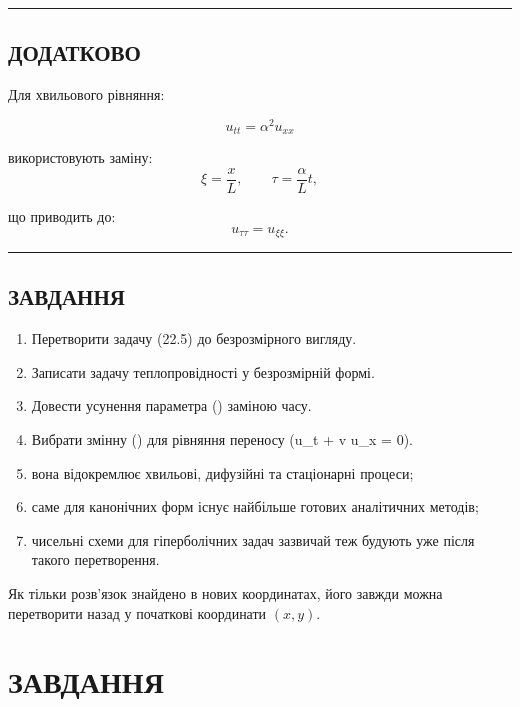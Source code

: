 \documentclass[
  ukrainian,
]{article}
\providecommand{\tightlist}{%
  \setlength{\itemsep}{0pt}\setlength{\parskip}{0pt}}
\begin{document}
\begin{center}\rule{0.5\linewidth}{0.5pt}\end{center}

\subsection{ДОДАТКОВО}\label{ux434ux43eux434ux430ux442ux43aux43eux432ux43e}

Для хвильового рівняння:

\[
u_{tt} = \alpha^2 u_{xx}
\]

використовують заміну: \[
\xi = \frac{x}{L}, \qquad \tau = \frac{\alpha}{L} t,
\]

що приводить до: \[
u_{\tau\tau} = u_{\xi\xi}.
\]

\begin{center}\rule{0.5\linewidth}{0.5pt}\end{center}

\subsection{ЗАВДАННЯ}\label{ux437ux430ux432ux434ux430ux43dux43dux44f-15}

\begin{enumerate}
\def\labelenumi{\arabic{enumi}.}
\tightlist
\item
  Перетворити задачу (22.5) до безрозмірного вигляду.
\item
  Записати задачу теплопровідності у безрозмірній формі.
\item
  Довести усунення параметра (\alpha) заміною часу.
\item
  Вибрати змінну (\xi) для рівняння переносу (u\_t + v u\_x = 0).
\item
  вона відокремлює хвильові, дифузійні та стаціонарні процеси;
\item
  саме для канонічних форм існує найбільше готових аналітичних методів;
\item
  чисельні схеми для гіперболічних задач зазвичай теж будують уже після
  такого перетворення.
\end{enumerate}

Як тільки розв'язок знайдено в нових координатах, його завжди можна
перетворити назад у початкові координати \((x,y)\).

\section{ЗАВДАННЯ}\label{ux437ux430ux432ux434ux430ux43dux43dux44f-16}
\end{document}

